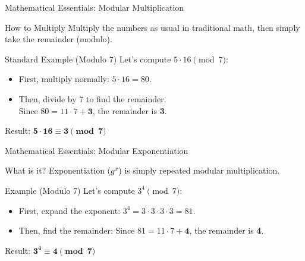 \documentclass[aspectratio=169, 10pt]{beamer}
\begin{document}
\begin{frame}{Mathematical Essentials: Modular Multiplication}
    
    \begin{block}{How to Multiply}
        Multiply the numbers as usual in traditional math, then simply take the remainder (modulo).
    \end{block}

    \vspace{0.4cm}
    \begin{exampleblock}{Standard Example (Modulo 7)}
        Let's compute $5 \cdot 16 \pmod 7$:
        \begin{itemize}
            \item First, multiply normally: $5 \cdot 16 = 80$.
            \item Then, divide by 7 to find the remainder. \\
            Since $80 = 11 \cdot 7 + \textbf{3}$, the remainder is \textbf{3}.
        \end{itemize}
        \vspace{0.2cm}
        Result: $\mathbf{5 \cdot 16 \equiv 3 \pmod 7}$
    \end{exampleblock}
\end{frame}

\begin{frame}{Mathematical Essentials: Modular Exponentiation}
    
    \begin{block}{What is it?}
        Exponentiation ($g^x$) is simply repeated modular multiplication.
    \end{block}

    \vspace{0.4cm}
    \begin{exampleblock}{Example (Modulo 7)}
        Let's compute $3^4 \pmod 7$:
        \begin{itemize}
            \item First, expand the exponent: $3^4 = 3 \cdot 3 \cdot 3 \cdot 3 = 81$.
            \vspace{0.2cm}
            \item Then, find the remainder: Since $81 = 11 \cdot 7 + \textbf{4}$, the remainder is \textbf{4}.
        \end{itemize}
        \vspace{0.2cm}
        Result: $\mathbf{3^4 \equiv 4 \pmod 7}$
    \end{exampleblock}
\end{frame}
\end{document}
